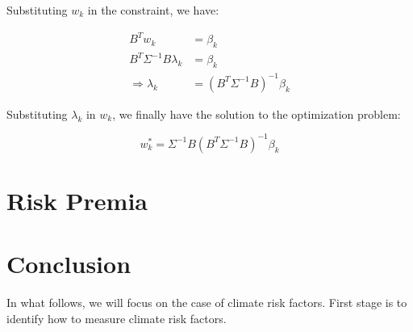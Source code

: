 Substituting $w_k$ in the constraint, we have:

\begin{equation}
    \begin{aligned}
        B^T w_k &= \beta_k \\
        B^T \Sigma^{-1} B \lambda_k &= \beta_k \\
        \Rightarrow \lambda_k &= (B^T \Sigma^{-1} B)^{-1} \beta_k
    \end{aligned}
\end{equation}

Substituting $\lambda_k$ in $w_k$, we finally have 
the solution to the optimization problem:

\begin{equation}
    w_k^* = \Sigma^{-1} B (B^T \Sigma^{-1} B)^{-1} \beta_k
\end{equation}


\section{Risk Premia}

\section{Conclusion}

In what follows, we will focus 
on the case of climate risk factors.
First stage is to identify how to measure 
climate risk factors.
